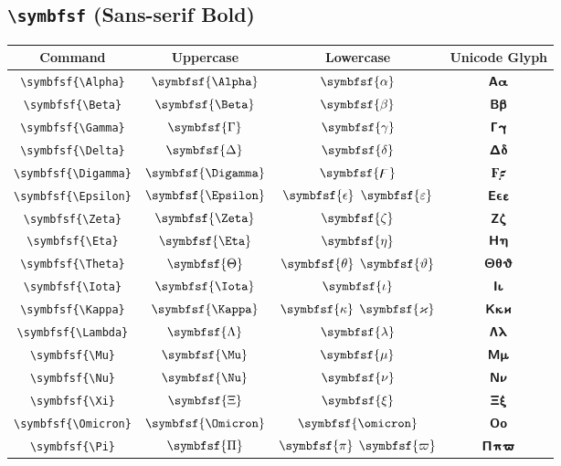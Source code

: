 \documentclass[12pt,a4paper]{article}
\begin{document}
\newpage

\subsection*{\texttt{\textbackslash{}symbfsf} (Sans-serif Bold)}

\begin{longtable}{|c|c|c|c|}
\hline
\textbf{Command} & \textbf{Uppercase} & \textbf{Lowercase} & \textbf{Unicode Glyph} \\
\hline
\verb|\symbfsf{\Alpha}| & $\symbfsf{\Alpha}$ & $\symbfsf{\alpha}$ & $ 𝝖 𝝰 $ \\
\verb|\symbfsf{\Beta}| & $\symbfsf{\Beta}$ & $\symbfsf{\beta}$ & $ 𝝗 𝝱 $ \\
\verb|\symbfsf{\Gamma}| & $\symbfsf{\Gamma}$ & $\symbfsf{\gamma}$ & $ 𝝘 𝝲 $ \\
\verb|\symbfsf{\Delta}| & $\symbfsf{\Delta}$ & $\symbfsf{\delta}$ & $ 𝝙 𝝳 $ \\
\verb|\symbfsf{\Digamma}| & $\symbfsf{\Digamma}$ & $\symbfsf{\digamma}$ & $ 𝟊 𝟋 $ \\
\verb|\symbfsf{\Epsilon}| & $\symbfsf{\Epsilon}$ & $\symbfsf{\epsilon}$ $\symbfsf{\varepsilon}$ & $ 𝝚 𝞊 𝝴 $ \\
\verb|\symbfsf{\Zeta}| & $\symbfsf{\Zeta}$ & $\symbfsf{\zeta}$ & $ 𝝛 𝝵 $ \\
\verb|\symbfsf{\Eta}| & $\symbfsf{\Eta}$ & $\symbfsf{\eta}$ & $ 𝝜 𝝶 $ \\
\verb|\symbfsf{\Theta}| & $\symbfsf{\Theta}$ & $\symbfsf{\theta}$ $\symbfsf{\vartheta}$ & $ 𝝝 𝝷 𝞋 $ \\
\verb|\symbfsf{\Iota}| & $\symbfsf{\Iota}$ & $\symbfsf{\iota}$ & $ 𝝞 𝝸 $ \\
\verb|\symbfsf{\Kappa}| & $\symbfsf{\Kappa}$ & $\symbfsf{\kappa}$ $\symbfsf{\varkappa}$ & $ 𝝟 𝝹 𝞌 $ \\
\verb|\symbfsf{\Lambda}| & $\symbfsf{\Lambda}$ & $\symbfsf{\lambda}$ & $ 𝝠 𝝺 $ \\
\verb|\symbfsf{\Mu}| & $\symbfsf{\Mu}$ & $\symbfsf{\mu}$ & $ 𝝡 𝝻 $ \\
\verb|\symbfsf{\Nu}| & $\symbfsf{\Nu}$ & $\symbfsf{\nu}$ & $ 𝝢 𝝼 $ \\
\verb|\symbfsf{\Xi}| & $\symbfsf{\Xi}$ & $\symbfsf{\xi}$ & $ 𝝣 𝝽 $ \\
\verb|\symbfsf{\Omicron}| & $\symbfsf{\Omicron}$ & $\symbfsf{\omicron}$ & $ 𝝤 𝝾 $ \\
\verb|\symbfsf{\Pi}| & $\symbfsf{\Pi}$ & $\symbfsf{\pi}$ $\symbfsf{\varpi}$ & $ 𝝥 𝝿 𝞏 $ \\

\end{longtable}
\end{document}
